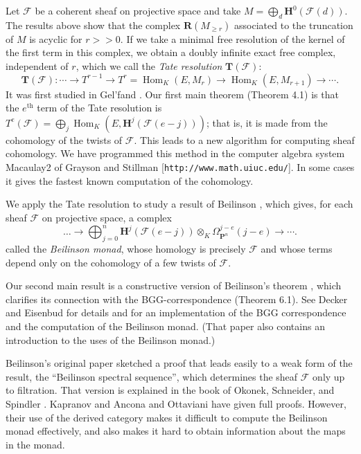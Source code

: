 \documentclass{tran-l}
\newcommand{\myHom}{\operatorname{Hom}}
\newcommand{\myth}{{\operatorname{th}}}
\newcommand{\F}{\mathcal{F}}
\newcommand{\myH}{\mathbf{H}}
\newcommand{\myP}{\mathbf{P}}
\newcommand{\RR}{\mathbf{R}}
\newcommand{\TT}{\mathbf{T}}
\theoremstyle{plain}
\theoremstyle{remark}
\theoremstyle{definition}
\begin{document}
Let  $\F $ be a coherent sheaf on projective space and  take
$M=\bigoplus _{d} \myH ^{0}(\F (d))$. The results above show that the complex
$\RR (M_{\geq r})
$
associated to the truncation of $M$
is acyclic for $r>>0$. If we take a minimal free resolution of the kernel
of the first term in this complex, we obtain a doubly infinite
exact free complex, independent of $r$, which we call
the {\em Tate resolution\/}  $\TT (\F )$:
\begin{equation*}\TT (\F ): \cdots \to T^{r-1}\to T^{r}=\myHom _{K}(E,M_{r})\to \myHom _{K}(E,
M_{r+1})\to \cdots. \end{equation*}
It was
first studied in Gel'fand \cite{Gel}. 
Our first main theorem  (Theorem 4.1) is that
the $e^{\myth }$ term of the Tate resolution is
$T^{e}(\F )=\bigoplus _{j}\myHom _{K}(E, \myH ^{j}(\F (e-j)))$; that is, 
it is made
from the cohomology of the twists of $\F $.
This leads to a new algorithm for computing sheaf
cohomology. We have  programmed
this method in the computer algebra system Macaulay2 of Grayson
and Stillman  [{\tt http://www.math.uiuc.edu/}]. In
some cases it gives the fastest known computation of the
cohomology. 

We apply the Tate resolution to study
a result of Beilinson \cite{Bei}, which
gives, for each sheaf $\F $ on projective space, a complex
\begin{equation*}\dots \to \bigoplus _{j=0}^{n}\myH ^{j}(\F (e-j))\otimes _{K}
\Omega _{\myP ^{n}}^{j-e}(j-e)
\to \cdots .\end{equation*}
called the {\em Beilinson monad\/}, whose homology is precisely
$\F $ and whose terms depend only on the cohomology of a few twists of
$\F $.

Our second main result is a constructive version of
Beilinson's theorem \cite{Bei}, which clarifies its connection with the
BGG-correspondence (Theorem 6.1). See Decker and
Eisenbud \cite{DE} for details and for an implementation of the BGG
correspondence and the computation of the Beilinson monad. (That paper
also contains an introduction to the uses of the Beilinson monad.)

Beilinson's original paper
sketched a proof that leads easily to a weak form of the result, the
``Beilinson spectral sequence'', which determines the sheaf $\F $ only
up to filtration. That version is explained in the book of Okonek,
Schneider, and Spindler \cite{OSS}. Kapranov \cite{Kap1} and Ancona and
Ottaviani \cite{AO} have given full proofs. However, their use of the
derived category makes it difficult to compute the Beilinson monad
effectively, and also makes it hard to obtain information about the
maps in the monad.
\end{document}
